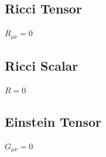 \documentclass{article}
\begin{document}
\subsection*{Ricci Tensor}
$R_{\mu\nu} = 0$\\
\subsection*{Ricci Scalar}
$R = 0$\\

\subsection*{Einstein Tensor}
$G_{\mu\nu} = 0$\\
\end{document}
